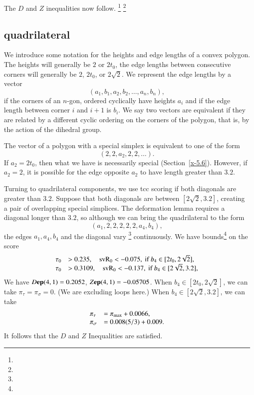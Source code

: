 The $D$ and $Z$ inequalities now follow.%
\footnote{} %
\footnote{} %

\subsection{quadrilateral} %

We introduce some notation for the heights and edge lengths of a convex
polygon.  The heights will generally be $2$ or $2t_0$, the edge lengths
between consecutive corners will generally be $2$, $2t_0$, or
$2\sqrt{2}$.  We represent the edge lengths by a vector
    $$(a_1,b_1,a_2,b_2,\ldots,a_n,b_n),$$
if the corners of an $n$-gon, ordered cyclically have heights $a_i$ and
if the edge length between corner $i$ and $i+1$ is $b_i$.  We say two
vectors are equivalent if they are related by a different cyclic
ordering on the corners of the polygon, that is, by the action of the
dihedral group.

The vector of a polygon with a special simplex is equivalent to one of
the form
    $$(2,2,a_2,2,2,\ldots).$$  If $a_2=2t_0$, then what we have is
necessarily special (Section~\ref{x-5.6}). However, if $a_2=2$, it is
possible for the edge opposite $a_2$ to have length greater than $3.2$.


Turning to quadrilateral components, we use tcc scoring if both diagonals
are greater than $3.2$.   Suppose that both diagonals are between
$[2\sqrt{2},3.2]$, creating a pair of overlapping special simplices. The
deformation lemma requires a diagonal longer than $3.2$, so although we
can bring the quadrilateral to the form
    $$(a_1,2,2,2,2,2,a_4,b_4),$$
the edges $a_1,a_4,b_4$ and the diagonal vary%
\footnote{} %
continuously.
We have bounds\footnote{} %
 on the score
    $$
    \begin{array}{lll}
    \tau_0 &> 0.235, \quad {\operatorname{svR}}_0 < -0.075,
                \hbox{ if } b_4\in[2t_0,2\sqrt{2}],\\
    \tau_0 &> 0.3109, \quad {\operatorname{svR}}_0 < -0.137,
                \hbox{ if } b_4\in[2\sqrt{2},3.2],\\
    \end{array}
    $$
We have $D{\operatorname{\bf ep}}{(4,1)}=0.2052$, $Z{\operatorname{\bf ep}}{(4,1)}=-0.05705$. When
$b_4\in[2t_0,2\sqrt{2}]$, we can take $\pi_\tau=\pi_\sigma=0$. (We are
excluding loops here.) When $b_4\in[2\sqrt{2},3.2]$, we can take
    $$
    \begin{array}{lll}
    \pi_\tau &= \pi_{\max}+ 0.0066, \\
    \pi_\sigma &= 0.008 (5/3)+ 0.009. \\
    \end{array}
    $$
It follows that the $D$ and $Z$ Inequalities are satisfied.

